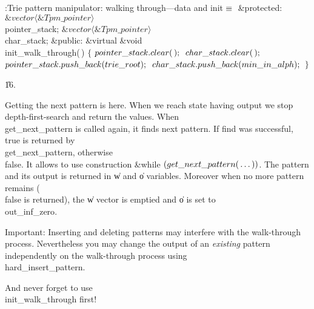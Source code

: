 \Y\B\4:Trie pattern manipulator: walking through---data and init\X${}\equiv{}$\6
\4\&{protected}:\6
${}\&{vector}\langle\&{Tpm\_pointer}\rangle{}$ \\{pointer\_stack};\6
${}\&{vector}\langle\&{Tpm\_pointer}\rangle{}$ \\{char\_stack};\7
\4\&{public}:\6
\&{virtual} \&{void} \\{init\_walk\_through}(\,)\1\1\2\2\6
${}\{{}$\1\6
${}\\{pointer\_stack}.\\{clear}(\,);{}$\6
${}\\{char\_stack}.\\{clear}(\,);{}$\6
${}\\{pointer\_stack}.\\{push\_back}(\\{trie\_root});{}$\6
${}\\{char\_stack}.\\{push\_back}(\\{min\_in\_alph});{}$\6
\4${}\}{}$\2\par
\U16.\fi

Getting the next pattern is here. When we reach state having output we
stop depth-first-search and return the values. When \\{get\_next\_pattern}
is called again, it finds next pattern. If find was successful, \\{true}
is returned by \\{get\_next\_pattern}, otherwise \\{false}. It allows to use
construction \&{while} ${}(\\{get\_next\_pattern}(\,\ldots\,))$. The pattern
and its output
is returned in \|w and \|o variables. Moreover when no more pattern
remains (\\{false} is returned), the \|w vector is emptied and \|o is set
to \\{out\_inf\_zero}.

Important: Inserting and deleting patterns may interfere with the
walk-through process. Nevertheless you may change the output of an {\it
existing\/} pattern independently on the walk-through process using
\\{hard\_insert\_pattern}.

And never forget to use \\{init\_walk\_through} first!

